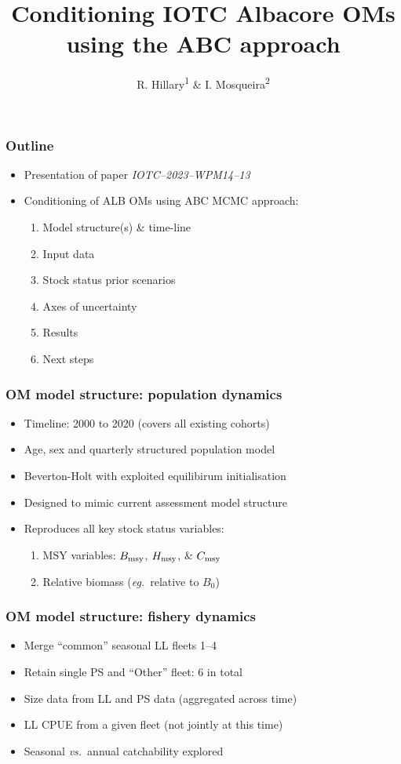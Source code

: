 \documentclass{beamer}
\title{Conditioning IOTC Albacore OMs using the ABC approach}
\author{R. Hillary\textsuperscript{1} \& I. Mosqueira\textsuperscript{2}}
\institute{\textsuperscript{1}CSIRO Environment \& \textsuperscript{2}University of Wageningen}
\newcommand{\bmsy}{B_{\rm msy}}
\newcommand{\cmsy}{C_{\rm msy}}
\newcommand{\hmsy}{H_{\rm msy}}
\newcommand{\vs}{\textit{vs.}~}
\newcommand{\eg}{\textit{eg.}~}
\begin{document}
\maketitle
\begin{frame}
\frametitle{Outline}
\begin{itemize}
    \item Presentation of paper \textit{IOTC--2023--WPM14--13}
    \item Conditioning of ALB OMs using ABC MCMC approach:
        \vspace{0.25cm} 
        \begin{enumerate}
            \item Model structure(s) \& time-line
            \item Input data
            \item Stock status prior scenarios
            \item Axes of uncertainty
            \item Results
            \item Next steps
        \end{enumerate}
\end{itemize}
\end{frame}
\begin{frame}
\frametitle{OM model structure: population dynamics}
\begin{itemize}
    \item Timeline: 2000 to 2020 (covers all existing cohorts)
    \item Age, sex and quarterly structured population model
    \item Beverton-Holt with exploited equilibirum initialisation
    \item Designed to mimic current assessment model structure
    \item Reproduces all key stock status variables:
        \vspace{0.25cm}
        \begin{enumerate}
            \item MSY variables: $\bmsy$, $\hmsy$, \& $\cmsy$
            \item Relative biomass (\eg relative to $B_0$)
        \end{enumerate}
\end{itemize}
\end{frame}
\begin{frame}
\frametitle{OM model structure: fishery dynamics}
\begin{itemize}
    \item Merge ``common'' seasonal LL fleets 1--4
    \item Retain single PS and ``Other'' fleet: 6 in total
    \item Size data from LL and PS data (aggregated across time)
    \item LL CPUE from a given fleet (not jointly at this time)
    \item Seasonal \vs annual catchability explored
\end{itemize}
\end{frame}
\end{document}
